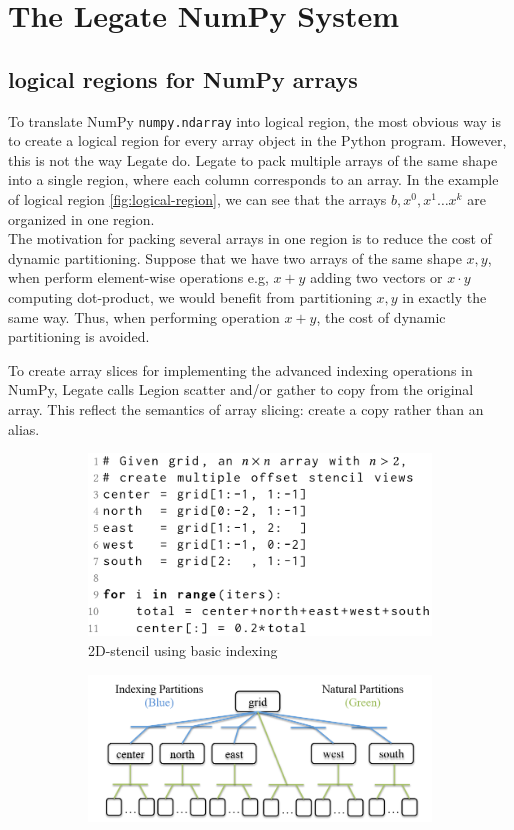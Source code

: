 \documentclass{article}
\newenvironment{newSec}[1]{
	\section{#1}
	\lhead{#1}
}{ \newpage }
\newenvironment{newSubsec}[1]{
	\subsection{#1}
}{}
\begin{document}
\begin{newSec}{The Legate NumPy System}
	\begin{newSubsec}{logical regions for NumPy arrays}
		To translate NumPy \texttt{numpy.ndarray} into logical region, the most obvious way is to create a logical region for every array object in the Python program.
		However, this is not the way Legate do. Legate to pack multiple arrays of the same shape into a single region, where each column corresponds to an array.
		In the example of logical region \ref{fig:logical-region}, we can see that the arrays $b,x^0,x^1\ldots x^k$ are organized in one region.\\
		The motivation for packing several arrays in one region is to reduce the cost of dynamic partitioning.
		Suppose that we have two arrays of the same shape $x,y$, when perform element-wise operations e.g, $x+y$ adding two vectors or $x\cdot y$ computing dot-product,
		we would benefit from partitioning $x,y$ in exactly the same way.
		Thus, when performing operation $x+y$, the cost of dynamic partitioning is avoided.\par
		To create array slices for implementing the advanced indexing operations in NumPy, Legate calls Legion scatter and/or gather to copy from the original array.
		This reflect the semantics of array slicing: create a copy rather than an alias.\\
		\begin{figure}[htbp]
			\begin{center}
				\begin{subfigure}{0.4\textwidth}
					\centering
					\includegraphics[scale=0.6]{fig/code-stencil.png}
					\caption{2D-stencil using basic indexing}
				\end{subfigure}
				\begin{subfigure}{0.4\textwidth}
					\centering
					\includegraphics[scale=0.6]{fig/stencil-region.png}

\end{subfigure}
\end{center}
\end{figure}
\end{newSubsec}
\end{newSec}
\end{document}
